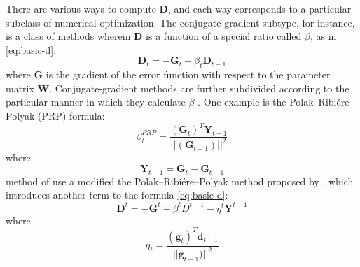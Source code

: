 There are various ways to compute $\textbf{D}$, and each way corresponds to a 
particular subclass of numerical optimization. The conjugate-gradient subtype, 
for instance, is a class of methods wherein $\textbf{D}$ is a function 
of a special ratio called $\beta$, as in \eqref{eq:basic-d}. 
\begin{equation}\label{eq:basic-d}
\textbf{D}_{t} = -\textbf{G}_{t}  + \beta_{t} \textbf{D}_{t-1} 
\end{equation}
where \textbf{G} is the gradient of the error function with respect to the parameter matrix $\textbf{W}$.
Conjugate-gradient methods are further subdivided according to the particular manner in which they calculate $\beta$ \citet[For an overview of the available options, see][]{hager:2006}. One example is the Polak--Ribi\'{e}re--Polyak (PRP) formula:
\begin{equation}\label{eq:PRP}
\beta_{t}^{PRP} = \frac{(\textbf{G}_{t})^{T}{\textbf{Y}_{t-1}}}{{||(\textbf{G}_{t-1})||}^2}
\end{equation}
where
\begin{equation}\label{eq:y}
\textbf{Y}_{t-1} = \textbf{G}_{t} - \textbf{G}_{t-1} 
\end{equation}
method of \citet{cheng-and-li:2012} use a modified the Polak--Ribi\'{e}re--Polyak method proposed by \citet{zhang-et-al:2006}, which introduces another term to the formula \eqref{eq:basic-d}:
\begin{equation}\label{eq:mod-d-update}
\textbf{D}^{t} = -\textbf{G}^{t}  + \beta^{t} D^{t-1} - \eta^{t} \textbf{Y}^{t-1}
\end{equation}
where 
\begin{equation}
\label{eq:eta}
\eta_{t} = \frac{(\textbf{g}_{t})^{T}{\textbf{d}_{t-1}}}{{||\textbf{g}_{t-1})||}^2}
\end{equation}

